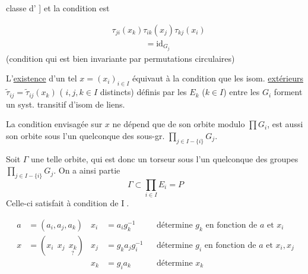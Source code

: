 classe  d' ] et la condition est

\[
\begin{aligned}
&\tau_{ji}(x_k)\tau_{ik}(x_j)\tau_{kj}(x_i)\\
&\hspace{4em}=\mathrm{id}_{G_j}
\end{aligned}
\]
(condition qui est bien invariante par permutations circulaires)

L'\uline{existence} d'un tel $x=(x_i)_{i\in I}$ équivaut à la condition que les isom. \uline{extérieurs} $\widetilde\tau_{ij}=\widetilde\tau_{ij}(x_k)$ ( $i,j,k\in I$ distincts) définis par les $E_k$ ($k\in I$) entre les $G_i$ forment un syst. transitif d'isom de liens.

La condition envisagée sur $x$ ne dépend que de son orbite modulo $\prod G_i$,  est aussi son orbite sous l'un quelconque des sous-gr. $\prod_{j\in I-\{i\}}G_j$.

Soit $\Gamma$ une telle orbite, qui est donc un torseur sous l'un quelconque des  groupes $\prod_{j\in I-\{i\}}G_j$. On a ainsi   partie
\[
\Gamma\subset\prod_{i\in I} E_i=P
\]
Celle-ci satisfait à  condition de \textcircled{I}.

\[
\begin{aligned}
a&=(a_i,a_j,a_k)&x_i&=a_i g_k^{-1}& &\text{détermine }g_k\text{ en fonction de }a\text{ et }x_i\\
x&=(x_i\ \ x_j\ \ \underset{?}{x_k})&x_j&=g_k a_j g_i^{-1}& &\text{détermine }g_i\text{ en fonction de }a\text{ et }x_i,x_j\\
&&x_k&=g_i a_k&&\text{détermine }x_k
\end{aligned}
\]

